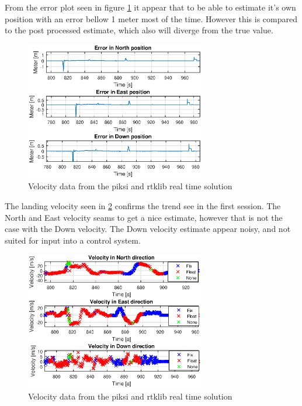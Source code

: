 From the error plot seen in figure \ref{figure:landingErrorNorthEastDownFlight} it appear that to be able to estimate it's own position with an error bellow 1 meter most of the time. However this is compared to the post processed estimate, which also will diverge from the true value.

\begin{figure}[H]
	\centering
		\includegraphics[width=0.7\textwidth]{figs/plots/landingErrorNorthEastDownFlight.eps}
		\caption{Velocity data from the piksi and rtklib real time solution}
		\label{figure:landingErrorNorthEastDownFlight}
\end{figure}
The landing velocity seen in \ref{figure:landingVelocity} confirms the trend see in the first session. The North and East velocity seams to get a nice estimate, however that is not the case with the Down velocity. The Down velocity estimate appear noisy, and not suited for input into a control system. 
\begin{figure}[H]
	\centering
		\includegraphics[width=0.7\textwidth]{figs/plots/landingVelocity.eps}
		\caption{Velocity data from the piksi and rtklib real time solution}
		\label{figure:landingVelocity}
\end{figure}
\cleardoublepage